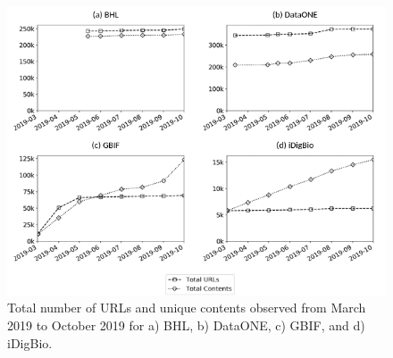 \begin{figure}[ht] %


\includegraphics[width=\textwidth]{figures/fig3.png}

\caption{
Total number of URLs and unique contents observed from March 2019 to October 2019 for a) BHL, b) DataONE, c) GBIF, and d) iDigBio.
}

\label{fig3} %

\end{figure}

